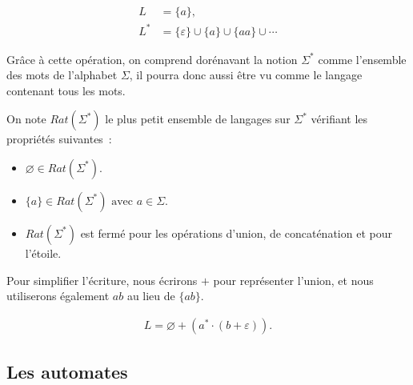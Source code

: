 \begin{example}
  \vspace{-\baselineskip}
  \begin{align*}
    L &= \{a\}, \\
    L^* &= \{\varepsilon\} \cup \{a\} \cup \{aa\} \cup \cdots
  \end{align*}
\end{example}

\begin{remark}
  Grâce à cette opération, on comprend dorénavant la notion \(\Sigma^*\) comme
  l'ensemble des mots de l'alphabet \(\Sigma\), il pourra donc aussi être vu
  comme le langage contenant tous les mots.
\end{remark}

\begin{definition}
  On note \(Rat(\Sigma^*)\) le plus petit ensemble de langages sur
  \(\Sigma^*\) vérifiant les propriétés suivantes~:

  \vphantom{}

  \begin{itemize}
    \item[\bullet] \(\varnothing \in Rat(\Sigma^*)\).
    \item[\bullet] \(\{a\} \in Rat(\Sigma^*) \text{ avec } a \in \Sigma\).
    \item[\bullet] \(Rat(\Sigma^*)\) est fermé pour les opérations d'union,
    de concaténation et pour l'étoile.
  \end{itemize}
\end{definition}

\begin{remark}
  Pour simplifier l’écriture, nous écrirons \(+\) pour représenter l’union, et
  nous utiliserons également \(ab\) au lieu de \(\{ab\}\).
\end{remark}

\begin{example}
  \vspace{-\baselineskip}
  \begin{align*}
    L = \varnothing + (a^* \cdot (b + \varepsilon)).
  \end{align*}
\end{example}

\subsection{Les automates}

